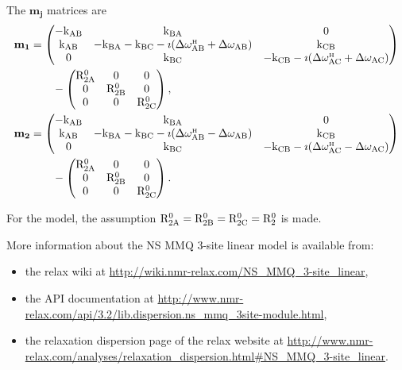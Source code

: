 The $\mathbf{m_j}$ matrices are
\begin{subequations}
\begin{align}
    \mathbf{m_1} &= \begin{pmatrix}
                        -\textrm{k}_{\textrm{AB}}   & \textrm{k}_{\textrm{BA}}                                  & 0    \\
                        \textrm{k}_{\textrm{AB}}    & -\textrm{k}_{\textrm{BA}} -\textrm{k}_{\textrm{BC}} -\imath(\Delta\omega^{\scriptscriptstyle\mathrm{H}}_{\textrm{AB}} + \Delta\omega_{\textrm{AB}})   & \textrm{k}_{\textrm{CB}} \\
                        0       & \textrm{k}_{\textrm{BC}}                                  & - \textrm{k}_{\textrm{CB}}  -\imath(\Delta\omega^{\scriptscriptstyle\mathrm{H}}_{\textrm{AC}} + \Delta\omega_{\textrm{AC}})
                    \end{pmatrix}  \nonumber \\
                 &\qquad - \begin{pmatrix}
                               \mathrm{R}_{\mathrm{2A}}^0 & 0          & 0    \\
                               0          & \mathrm{R}_{\mathrm{2B}}^0 & 0    \\
                               0          & 0          & \mathrm{R}_{\mathrm{2C}}^0
                           \end{pmatrix}, \\
    \mathbf{m_2} &= \begin{pmatrix}
                        -\textrm{k}_{\textrm{AB}}   & \textrm{k}_{\textrm{BA}}                                  & 0    \\
                        \textrm{k}_{\textrm{AB}}    & -\textrm{k}_{\textrm{BA}} -\textrm{k}_{\textrm{BC}} -\imath(\Delta\omega^{\scriptscriptstyle\mathrm{H}}_{\textrm{AB}} - \Delta\omega_{\textrm{AB}})   & \textrm{k}_{\textrm{CB}} \\
                        0       & \textrm{k}_{\textrm{BC}}                                  & -\textrm{k}_{\textrm{CB}} -\imath(\Delta\omega^{\scriptscriptstyle\mathrm{H}}_{\textrm{AC}} - \Delta\omega_{\textrm{AC}})
                    \end{pmatrix}  \nonumber \\
                 &\qquad - \begin{pmatrix}
                               \mathrm{R}_{\mathrm{2A}}^0 & 0          & 0    \\
                               0          & \mathrm{R}_{\mathrm{2B}}^0 & 0    \\
                               0          & 0          & \mathrm{R}_{\mathrm{2C}}^0
                           \end{pmatrix}.
\end{align}
\end{subequations}

For the model, the assumption $\mathrm{R}_{\mathrm{2A}}^0 = \mathrm{R}_{\mathrm{2B}}^0 = \mathrm{R}_{\mathrm{2C}}^0 = \mathrm{R}_2^0$ is made.

More information about the NS MMQ 3-site linear model is available from:
\begin{itemize}
  \item the relax wiki at \url{http://wiki.nmr-relax.com/NS\_MMQ\_3-site\_linear},
  \item the API documentation at \url{http://www.nmr-relax.com/api/3.2/lib.dispersion.ns\_mmq\_3site-module.html},
  \item the relaxation dispersion page of the relax website at \url{http://www.nmr-relax.com/analyses/relaxation\_dispersion.html#NS\_MMQ\_3-site\_linear}.
\end{itemize}


